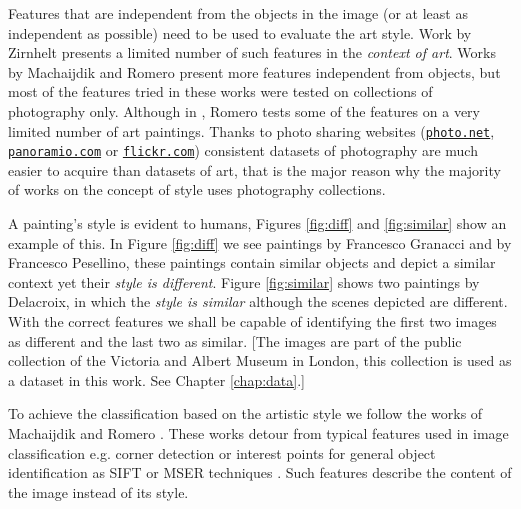 \documentclass[11pt,a4paper,twoside,openright]{report}
\begin{document}
Features that are independent from the objects in the image (or at least as
independent as possible) need to be used to evaluate the art style.  Work by
Zirnhelt \cite{zirnhelt07art} presents a limited number of such features in the
\emph{context of art}.  Works by Machaijdik \cite{mach10clas} and Romero
\cite{rmc12ajs} present more features independent from objects, but most of the
features tried in these works were tested on collections of photography only.
Although in \cite{rmc12ajs}, Romero tests some of the features on a very
limited number of art paintings.  Thanks to photo sharing websites
(\href{http://photo.net}{\texttt{photo.net}},
\href{http://panoramio.com}{\texttt{panoramio.com}} or
\href{http://flickr.com}{\texttt{flickr.com}}) consistent datasets of
photography are much easier to acquire than datasets of art, that is the major
reason why the majority of works on the concept of style uses photography
collections.

A painting's style is evident to humans, Figures \ref{fig:diff} and
\ref{fig:similar} show an example of this.  In Figure \ref{fig:diff} we see
paintings by Francesco Granacci and by Francesco Pesellino, these paintings
contain similar objects and depict a similar context yet their \emph{style is
different}.  Figure \ref{fig:similar} shows two paintings by Delacroix, in
which the \emph{style is similar} although the scenes depicted are different.
With the correct features we shall be capable of identifying the first two
images as different and the last two as similar.  [The images are part of the
public collection of the Victoria and Albert Museum in London, this collection
is used as a dataset in this work.  See Chapter \ref{chap:data}.]

To achieve the classification based on the artistic style we follow the works
of Machaijdik \cite{mach10clas} and Romero \cite{rmc12ajs}.  These works detour
from typical features used in image classification e.g.  corner detection or
interest points for general object identification as SIFT or MSER techniques
\cite{szel11book}.  Such features describe the content of the image instead of
its style.
\end{document}
